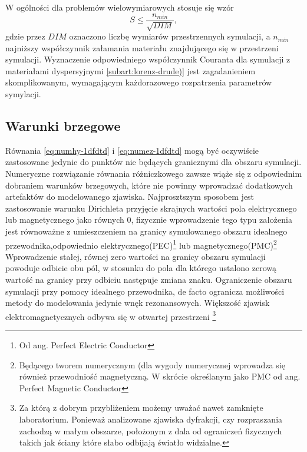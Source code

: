 W ogólności dla problemów wielowymiarowych stosuje się wzór
\begin{equation}
S\le\frac{n_{min}}{\sqrt{DIM}},
\label{eq:courant}
\end{equation}
gdzie przez $DIM$ oznaczono liczbę wymiarów przestrzennych symulacji, a $n_{min}$ najniższy współczynnik załamania materiału znajdującego się w przestrzeni symulacji. Wyznaczenie odpowiedniego współczynnik Couranta dla symulacji z materiałami dyspersyjnymi \ref{subart:lorenz-drude)} jest zagadanieniem skomplikowanym, wymagającym każdorazowego rozpatrzenia parametrów symylacji.


\subsection{Warunki brzegowe}
Równania \ref{eq:numhy-1dfdtd} i \ref{eq:numez-1dfdtd} mogą być oczywiście zastosowane jedynie do punktów nie będących granicznymi dla obszaru symulacji. Numeryczne rozwiązanie równania różniczkowego zawsze wiąże się z odpowiednim dobraniem warunków brzegowych, które nie powinny wprowadzać dodatkowych artefaktów do modelowanego zjawiska. Najprosztszym sposobem jest zastosowanie warunku Dirichleta przyjęcie skrajnych wartości pola elektrycznego lub magnetycznego jako równych 0, fizycznie wprowadzenie tego typu założenia jest równoważne z umieszczeniem na granicy symulowanego obszaru idealnego przewodnika,odpowiednio elektrycznego(PEC)\footnote{Od ang. Perfect Electric Conductor} lub magnetycznego(PMC)\footnote{Będącego tworem numerycznym (dla wygody numerycznej wprowadza się również przewodniość magnetyczną. W skrócie określanym jako PMC od ang. Perfect Magnetic Conductor} Wprowadzenie stałej, równej zero wartości na granicy obszaru symulacji powoduje odbicie obu pól, w stosunku do pola dla którego ustalono zerową wartość na granicy przy odbiciu następuje zmiana znaku. Ograniczenie obszaru symulacji przy pomocy idealnego przewodnika, de facto ogranicza możliwości metody do modelowania jedynie wnęk rezonansowych. Większość zjawisk elektromagnetycznych odbywa się w otwartej przestrzeni \footnote{Za którą z dobrym przybliżeniem możemy uważać nawet zamknięte laboratorium. Ponieważ analizowane zjawiska dyfrakcji, czy rozpraszania zachodzą w małym obszarze, położonym z dala od ograniczeń fizycznych takich jak ściany które słabo odbijają światło widzialne.}

